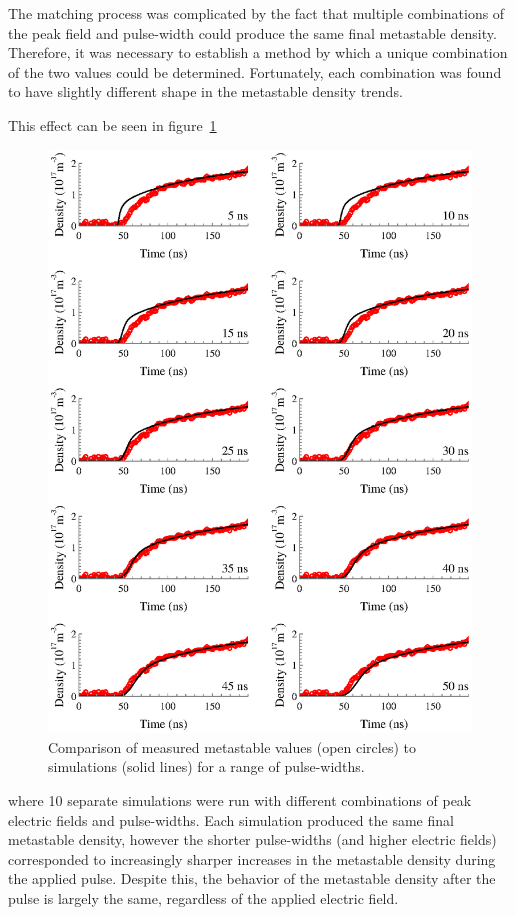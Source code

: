 The matching process was complicated by the fact that multiple combinations of
the peak field and pulse-width could produce the same final metastable density.
Therefore, it was necessary to establish a method by which a unique combination
of the two values could be determined. Fortunately, each combination was found
to have slightly different shape in the metastable density trends.

This effect can be seen in figure~\ref{fig:widths}
\begin{figure}
  \centering
  \includegraphics{./chapters/modeling/figures/widths.eps}
  \caption{Comparison of measured metastable values (open circles) to
    simulations (solid lines) for a range of pulse-widths.}
  \label{fig:widths}
\end{figure}
where 10 separate simulations were run with different combinations of peak
electric fields and pulse-widths. Each simulation produced the same final
metastable density, however the shorter pulse-widths (and higher electric
fields) corresponded to increasingly sharper increases in the metastable
density during the applied pulse. Despite this, the behavior of the metastable
density after the pulse is largely the same, regardless of the applied electric
field.

